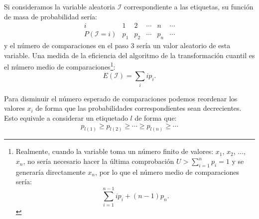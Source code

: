 \documentclass[
  spanish,
  10pt,
]{book}
\theoremstyle{break}
\theoremstyle{nonumberplain}
\let\oldfootnote\footnote
\renewcommand\footnote[1]{\oldfootnote{\hspace{2mm}#1}}
\begin{document}
Si consideramos la variable aleatoria \(\mathcal{I}\) correspondiente a las etiquetas, su función de masa de probabilidad sería:
\[\begin{array}{l|ccccc}
i & 1 & 2 & \cdots & n & \cdots \\ \hline
P\left( \mathcal{I}=i\right) & p_{1} & p_{2} & \cdots & p_{n} & \cdots 
\end{array}\]
y el número de comparaciones en el paso 3 sería un valor aleatorio de esta variable.
Una medida de la eficiencia del algoritmo de la transformación cuantil es el número medio de comparaciones\footnote{Realmente, cuando la variable toma un número finito de valores: \(x_{1}\), \(x_{2}\), \(\ldots\), \(x_{n}\), no sería necesario hacer
  la última comprobación \(U>\sum_{i=1}^{n}p_{i}=1\) y se generaría directamente \(x_{n}\), por lo que el número medio de comparaciones sería: \[\sum_{i=1}^{n-1}ip_{i}+\left( n-1\right)  p_{n}.\]}:
\[E\left( \mathcal{I}\right) =\sum_i ip_{i}.\]

Para disminuir el número esperado de comparaciones podemos
reordenar los valores \(x_{i}\) de forma que las probabilidades
correspondientes sean decrecientes. Esto equivale a considerar
un etiquetado \(l\) de forma que:
\[p_{l\left( 1\right) }\geq p_{l\left( 2\right) }\geq \cdots \geq p_{l\left(
n\right) }\geq \cdots\]
\end{document}
